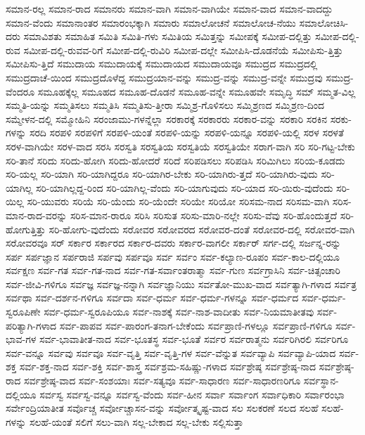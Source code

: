 {ಸಮಾನ-ರಲ್ಲ
ಸಮಾನ-ರಾದ
ಸಮಾನರು
ಸಮಾನ-ವಾಗಿ
ಸಮಾನ-ವಾಗಿಯೇ
ಸಮಾನ-ವಾದ
ಸಮಾನ-ವಾದದ್ದು
ಸಮಾನ-ವೆಂದು
ಸಮಾನಾಂತರ
ಸಮಾರಂಭಕ್ಕಾಗಿ
ಸಮಾರು
ಸಮಾಲೋಚನೆ
ಸಮಾಲೋಚ-ನೆಯು
ಸಮಾಲೋಚಿಸಿ-ದರು
ಸಮಾವಿಶತು
ಸಮಾಹಿತ
ಸಮಿತಿ
ಸಮಿತಿ-ಗಳು
ಸಮಿತಿಯ
ಸಮಿತ್ತನ್ನು
ಸಮೀಪಕ್ಕೆ
ಸಮೀಪ-ದಲ್ಲಿತ್ತು
ಸಮೀಪ-ದಲ್ಲಿ-ರುವ
ಸಮೀಪ-ದಲ್ಲಿ-ರುವವ-ರಿಗೆ
ಸಮೀಪ-ದಲ್ಲಿ-ರುವಿರಿ
ಸಮೀಪ-ದಲ್ಲೇ
ಸಮೀಪಿಸಿ-ದೊಡನೆಯೆ
ಸಮೀಪಿಸು-ತ್ತಿತ್ತು
ಸಮೀಪಿಸು-ತ್ತಿದೆ
ಸಮುದಾಯ
ಸಮುದಾಯಕ್ಕೆ
ಸಮುದಾಯದ
ಸಮುದಾಯವೂ
ಸಮುದ್ರದ
ಸಮುದ್ರದಲ್ಲಿ
ಸಮುದ್ರದಾಚೆ-ಯಿಂದ
ಸಮುದ್ರದೊಳೆದ್ದ
ಸಮುದ್ರಯಾನ-ವನ್ನು
ಸಮುದ್ರ-ವನ್ನು
ಸಮುದ್ರ-ವನ್ನೇ
ಸಮುದ್ರವು
ಸಮುದ್ರ-ವೆಂದರೂ
ಸಮೂಹಕ್ಕೆಲ್ಲ
ಸಮೂಹದ
ಸಮೂಹ-ದೊಡನೆ
ಸಮೂಹ-ವನ್ನೇ
ಸಮೂಹವೇ
ಸಮೃದ್ಧಿ
ಸಮ್
ಸಮ್ಮತ-ವಿಲ್ಲ
ಸಮ್ಮತಿ-ಯನ್ನು
ಸಮ್ಮತಿಸಲು
ಸಮ್ಮತಿಸಿ
ಸಮ್ಮತಿಸು-ತ್ತೀರಾ
ಸಮ್ಮಿಶ್ರ-ಗೊಳಿಸಲು
ಸಮ್ಮಿಶ್ರಣದ
ಸಮ್ಮಿಶ್ರಣ-ದಿಂದ
ಸಮ್ಮೇಳನ-ದಲ್ಲಿ
ಸಮ್ಮೋಹಿನಿ
ಸರಂಜಾಮು-ಗಳನ್ನೆಲ್ಲಾ
ಸರಕಾರಕ್ಕೆ
ಸರಕಾರರು
ಸರಕಾರ-ವನ್ನು
ಸರಕಾರಿ
ಸರಕಿನ
ಸರಕು-ಗಳನ್ನು
ಸರದಿ
ಸರಪಳಿ
ಸರಪಳಿಗೆ
ಸರಪಳಿ-ಯಂತೆ
ಸರಪಳಿ-ಯನ್ನು
ಸರಪಳಿ-ಯನ್ನೂ
ಸರಪಳಿ-ಯಲ್ಲಿ
ಸರಳ
ಸರಳತೆ
ಸರಳ-ವಾಗಿಯೇ
ಸರಳ-ವಾದ
ಸರಸಿ
ಸರಸ್ವತಿ
ಸರಸ್ವತಿಯ
ಸರಸ್ವತಿಯೆ
ಸರಸ್ವತಿಯೇ
ಸರಾಗ-ವಾಗಿ
ಸರಿ
ಸರಿ-ಗಟ್ಟ-ಬೇಕು
ಸರಿ-ತಾನೆ
ಸರಿದು
ಸರಿದು-ಹೋಗಿ
ಸರಿದು-ಹೋದರೆ
ಸರಿದೆ
ಸರಿಪಡಿಸಲು
ಸರಿಪಡಿಸಿ
ಸರಿಮಿಗಿಲು
ಸರಿಯ-ಕೂಡದು
ಸರಿ-ಯಲ್ಲ
ಸರಿ-ಯಾಗಿ
ಸರಿ-ಯಾಗಿದ್ದರೂ
ಸರಿ-ಯಾಗಿರ-ಬೇಕು
ಸರಿ-ಯಾಗಿರು-ತ್ತದೆ
ಸರಿ-ಯಾಗಿರು-ವುದು
ಸರಿ-ಯಾಗಿಲ್ಲ
ಸರಿ-ಯಾಗಿಲ್ಲದ್ದ-ರಿಂದ
ಸರಿ-ಯಾಗಿಲ್ಲ-ವೆಂದು
ಸರಿ-ಯಾಗುವುದು
ಸರಿ-ಯಾದ
ಸರಿ-ಯಿರು-ವುದೆಂದು
ಸರಿ-ಯಿಲ್ಲ
ಸರಿ-ಯುವರು
ಸರಿಯೆ
ಸರಿ-ಯೆಂದು
ಸರಿ-ಯೆಂದೇ
ಸರಿಯೇ
ಸರಿಯೋ
ಸರಿಸಮ-ನಾದ
ಸರಿಸಮ-ವಾಗಿ
ಸರಿಸ-ಮಾನ-ರಾದ-ವರನ್ನು
ಸರಿಸ-ಮಾನ-ರಾರೂ
ಸರಿಸಿ
ಸರಿಸುತ
ಸರಿಸು-ಮಾರಿ-ನಲ್ಲೇ
ಸರಿಸು-ವೆವು
ಸರಿ-ಹೊಂದುತ್ತದೆ
ಸರಿ-ಹೋಗುತ್ತಿತ್ತು
ಸರಿ-ಹೋಗು-ವುದೆಂದು
ಸರೋವರ
ಸರೋವರದ
ಸರೋವರ-ದಂತೆ
ಸರೋವರ-ದಲ್ಲಿ
ಸರೋವರ-ವಾಗಿ
ಸರೋವರವೂ
ಸರ್
ಸರ್ಕಾರ
ಸರ್ಕಾರದ
ಸರ್ಕಾರ-ದವರು
ಸರ್ಕಾರ-ವಾಗಲೀ
ಸರ್ಕಾರ್
ಸರ್ಗ-ದಲ್ಲಿ
ಸರ್ಜನ್ನ-ರನ್ನು
ಸರ್ಪ
ಸರ್ಪಜ್ಞಾನ
ಸರ್ಪರಾಜಿ
ಸರ್ಪವು
ಸರ್ಪವೂ
ಸರ್ವ
ಸರ್ವಂ
ಸರ್ವ-ಕಲ್ಯಾಣ-ರೂಪಂ
ಸರ್ವ-ಕಾಲ-ದಲ್ಲಿಯೂ
ಸರ್ವಕ್ಷಣ
ಸರ್ವ-ಗತ
ಸರ್ವ-ಗತ-ನಾದ
ಸರ್ವ-ಗತ-ಸರ್ವಾಂತರಾತ್ಮಾ
ಸರ್ವ-ಗುಣ
ಸರ್ವಗ್ರಾಸಿನಿ
ಸರ್ವ-ಚಿತ್ಸಂಚಾರಿ
ಸರ್ವ-ಜೀವಿ-ಗಳಿಗೂ
ಸರ್ವಜ್ಞ
ಸರ್ವಜ್ಞ-ನನ್ನಾಗಿ
ಸರ್ವಜ್ಞಾನಿಯು
ಸರ್ವತೋ-ಮುಖ-ವಾದ
ಸರ್ವತ್ಯಾಗಿ-ಗಳಾದ
ಸರ್ವತ್ರ
ಸರ್ವಥಾ
ಸರ್ವ-ದರ್ಶನ-ಗಳಿಗೂ
ಸರ್ವದಾ
ಸರ್ವ-ಧರ್ಮ
ಸರ್ವ-ಧರ್ಮ-ಗಳನ್ನೂ
ಸರ್ವ-ಧರ್ಮದ
ಸರ್ವ-ಧರ್ಮ-ಸ್ವರೂಪಿಣೇ
ಸರ್ವ-ಧರ್ಮ-ಸ್ವರೂಪಿಯೂ
ಸರ್ವ-ನಾಶಕ್ಕೆ
ಸರ್ವ-ನಾಶ-ವಾದೀತು
ಸರ್ವ-ನಿಯಮಾತೀತವು
ಸರ್ವ-ಪರಿತ್ಯಾಗಿ-ಗಳಾದ
ಸರ್ವ-ಪಾಪವ
ಸರ್ವ-ಪಾರಂಗ-ತನಾಗ-ಬೇಕೆಂದು
ಸರ್ವಪ್ರಾಣಿ-ಗಳಲ್ಲೂ
ಸರ್ವಪ್ರಾಣಿ-ಗಳಿಗೂ
ಸರ್ವ-ಭಾವ-ಗಳ
ಸರ್ವ-ಭಾವಾತೀತ-ನಾದ
ಸರ್ವ-ಭೂತಸ್ಥ
ಸರ್ವ-ಭೂತೆ
ಸರ್ವರ
ಸರ್ವರಾತ್ಮನು
ಸರ್ವರಿಗಿರಲಿ
ಸರ್ವರಿಗೂ
ಸರ್ವ-ವನ್ನೂ
ಸರ್ವವು
ಸರ್ವವೂ
ಸರ್ವ-ವೃತ್ತಿ
ಸರ್ವ-ವೃತ್ತಿ-ಗಳ
ಸರ್ವ-ವೆನ್ನುತ
ಸರ್ವವ್ಯಾಪಿ
ಸರ್ವವ್ಯಾಪಿ-ಯಾದ
ಸರ್ವ-ಶಕ್ತ
ಸರ್ವ-ಶಕ್ತ-ನಾದ
ಸರ್ವ-ಶಕ್ತಿ
ಸರ್ವ-ಶಾಸ್ತ್ರ
ಸರ್ವಶ್ರಮ-ಸಹಿಷ್ಣು-ಗಳಾದ
ಸರ್ವಶ್ರೇಷ್ಠ
ಸರ್ವಶ್ರೇಷ್ಠ-ನಾದ
ಸರ್ವಶ್ರೇಷ್ಠ-ರಾದ
ಸರ್ವಶ್ರೇಷ್ಠ-ವಾದ
ಸರ್ವ-ಸಂಶಯಾಃ
ಸರ್ವ-ಸತ್ಯವೂ
ಸರ್ವ-ಸಾಧಾರಣ
ಸರ್ವ-ಸಾಧಾರಣರಿಗೂ
ಸರ್ವಸ್ಥಾನ-ದಲ್ಲಿಯೂ
ಸರ್ವಸ್ವ
ಸರ್ವಸ್ವ-ವನ್ನೂ
ಸರ್ವಸ್ವ-ವೆಂದು
ಸರ್ವ-ಹೀನ
ಸರ್ವಾ
ಸರ್ವಾಂಗ
ಸರ್ವಾಧಿಕಾರಿ
ಸರ್ವಾರಂಭಾ
ಸರ್ವೇಂದ್ರಿಯಾತೀತ
ಸರ್ವೊಚ್ಚ
ಸರ್ವೋಚ್ಚಾಸನ-ವನ್ನು
ಸರ್ವೋತ್ಕೃಷ್ಟ-ವಾದ
ಸಲ
ಸಲಕರಣೆ
ಸಲದ
ಸಲಹೆ
ಸಲಹೆ-ಗಳನ್ನು
ಸಲಹೆ-ಯಂತೆ
ಸಲಿಗೆ
ಸಲು-ವಾಗಿ
ಸಲ್ಲ-ಬೇಕಾದ
ಸಲ್ಲ-ಬೇಕು
ಸಲ್ಲಿಸುತ್ತಾ
}
